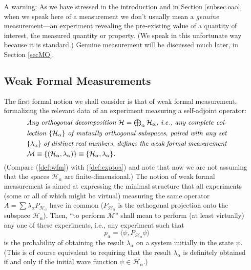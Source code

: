 \documentclass[12pt]{article}
\renewcommand{\a}{\alpha}
\newcommand{\la}{\lambda_{\a}}
\newcommand{\biga}{\bigoplus_{\a}}
\newcommand{\Ha}{{\H}_{\a}}
\renewcommand{\H}{\mbox{$\mathcal{H}$}}
\newcommand{\Pa}{ P_{ {\mathcal{H}_{\a} } } }
\newcommand{\M}{\mbox{$\mathcal{M}$}}
\begin{document}
   A warning: As we have stressed in the introduction and in Section
   \ref{subsec.oao}, when we speak here of a measurement we don't
   usually mean a {\em genuine} measurement---an experiment revealing
   the pre-existing value of a quantity of interest, the measured
   quantity or property. (We speak in this unfortunate way because it
   is standard.)  Genuine measurement will be discussed much later, in
   Section \ref{secMO}.


\subsection{Weak Formal Measurements}
\label{sec:MO}
The first formal notion we shall consider is that of weak formal
measurement, formalizing the relevant data of an experiment measuring
a self-adjoint operator:
\begin{equation}
\mbox{%
\begin{minipage}{0.85\textwidth}\openup 1.4\jot
   \setlength{\baselineskip}{12pt}\emph{Any orthogonal decomposition
     ${\H}=\biga {\Ha}$, i.e., any complete collection $\{ \Ha\}$ of
     mutually orthogonal subspaces, paired with any set $\{\la \}$ of
     distinct real numbers, defines the weak formal measurement
     $\M\equiv\{(\Ha, \la )\}\equiv\{\Ha, \la \}$.}
   \end{minipage}}
\label{def:wfm}
\end{equation}
(Compare (\ref{def:wfm}) with (\ref{def:exptoa}) and note that now we
are not assuming that the spaces $\Ha$ are finite-dimensional.)  The
notion of weak formal measurement is aimed at expressing the minimal
structure that all experiments (some or all of which might be virtual)
measuring the same operator $A= \sum\la\Pa$ have in common ($\Pa$ is
the orthogonal projection onto the subspace $\Ha$).  Then, ``to
perform \M'' shall mean to perform (at least virtually) any one of
these experiments, i.e., any experiment such that
\begin{equation}
p_{\a}=\langle \psi, \Pa\psi \rangle
\label{eq:prdeltass}
\end{equation}
is the probability of obtaining the result $\la$ on a system initially
in the state $\psi$.  (This is of course equivalent to requiring that
the result $\la$ is definitely obtained if and only if the initial
wave function $\psi\in \Ha$.)
\end{document}
